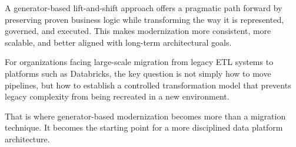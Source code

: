 \documentclass[11pt,a4paper]{article}
\begin{document}
A generator-based lift-and-shift approach offers a pragmatic path forward by preserving proven business logic while transforming the way it is represented, governed, and executed. This makes modernization more consistent, more scalable, and better aligned with long-term architectural goals.

For organizations facing large-scale migration from legacy ETL systems to platforms such as Databricks, the key question is not simply how to move pipelines, but how to establish a controlled transformation model that prevents legacy complexity from being recreated in a new environment.

That is where generator-based modernization becomes more than a migration technique. It becomes the starting point for a more disciplined data platform architecture.
\end{document}
